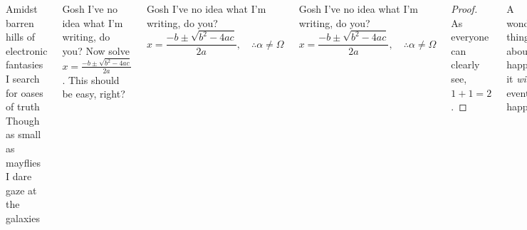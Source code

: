 \documentclass{beamer}
\begin{document}
\begin{frame}
\begin{columns}[T]
\bigskip
    
\renewcommand{\MiragePullquoteOpen}{«}
\begin{pullquote}
Amidst barren hills of electronic fantasies\\
I search for oases of truth\\
Though as small as mayflies\\
I dare gaze at the galaxies
\end{pullquote}

\begin{exampleblock}{Gosh I've no idea what I'm writing, do you?}
Now solve $x = \frac{-b \pm \sqrt{b^2 -4ac}}{2a}$. This should be easy, right?
\end{exampleblock}

\begin{alertblock}{Gosh I've no idea what I'm writing, do you?}
\[ x = \frac{-b \pm \sqrt{b^2 -4ac}}{2a}, \quad\therefore \alpha \neq \Omega \]
\end{alertblock}

\begin{block}{Gosh I've no idea what I'm writing, do you?}
\[ x = \frac{-b \pm \sqrt{b^2 -4ac}}{2a}, \quad\therefore \alpha \neq \Omega \]
\end{block}

\begin{proof}
As everyone can clearly see, $1+1=2$.
\end{proof}

\begin{theorem}
A wonderful thing is about to happen -- it \emph{will} eventually happen.
\end{theorem}

\begin{definition}
A wonderful thing is about to happen -- it \emph{will} eventually happen.
\end{definition}

\end{columns}


\end{frame}
\end{document}
